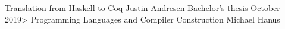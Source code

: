 \documentclass[10pt]{book}
\begin{document}
\frontmatter

\studtitlepage%
  {Translation from Haskell to Coq}
  {}%
  {Justin Andresen}%
  {Bachelor's thesis}%
  {October 2019>}%
  {Programming Languages and Compiler Construction}%
  {Michael Hanus}
\cleardoublepage
\eidesstatt



\tableofcontents
\mainmatter







\appendix

\backmatter
\nocite{*} %
\tocbibliography
\end{document}
